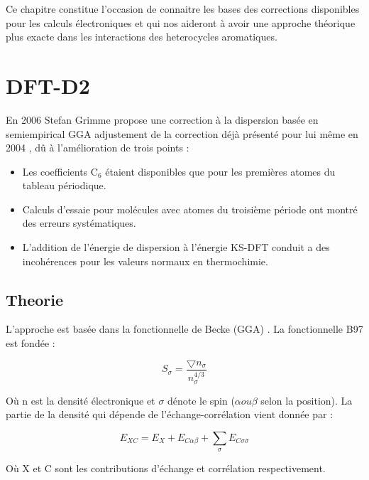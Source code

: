 	Ce chapitre constitue l'occasion de connaitre les bases des corrections disponibles pour les calculs électroniques et qui nos aideront à avoir une approche théorique plus exacte dans les interactions des heterocycles aromatiques.  
	
	\newpage
	
	\section{DFT-D2}
	
	En 2006 Stefan Grimme \cite{grimme2006semiempirical} propose une correction à la dispersion basée en semiempirical GGA adjustement de la correction déjà présenté pour lui même en 2004 \cite{grimme2004accurate}, dû à l'amélioration de trois points : 
	
	\begin{itemize}
		\item Les coefficients C$_{6}$ étaient disponibles que pour les premières atomes du tableau périodique.
		\item Calculs d'essaie pour molécules avec atomes du troisième période ont montré des erreurs systématiques. 
		\item L'addition de l'énergie de dispersion à l'énergie KS-DFT conduit a des incohérences pour les valeurs normaux en thermochimie. 
	\end{itemize} 
	
	\subsection{Theorie}
	
	L'approche est basée dans la fonctionnelle de Becke (GGA) \cite{becke1997density}. La fonctionnelle B97 est fondée : 
	
	\begin{equation}
	S_{\sigma} = \frac{\bigtriangledown n_{\sigma}}{n_{\sigma}^{4/3}}
	\end{equation}
	 
	 Où n est la densité électronique et $\sigma$ dénote le spin ($\alpha ou \beta$ selon la position). La partie de la densité qui dépende de l'échange-corrélation vient donnée par :
	 
	 \begin{equation}
	 E_{XC} = E_{X} + E_{C\alpha \beta} + \sum_{\sigma} E_{C\sigma \sigma}
	 \end{equation}
	
	Où X et C sont les contributions d'échange et corrélation respectivement. 
	
